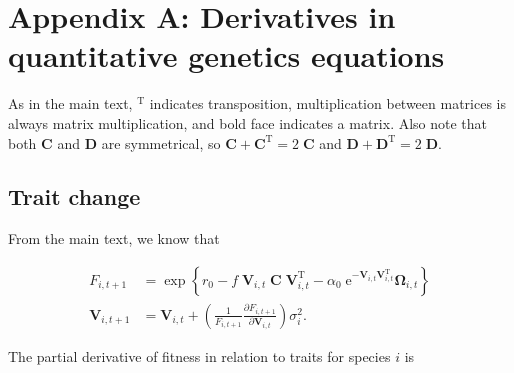\section*{Appendix A: Derivatives in quantitative genetics equations}

\renewcommand{\thefigure}{A\arabic{figure}}
\renewcommand{\theequation}{A\arabic{equation}}
\renewcommand{\thetable}{A\arabic{table}}
\setcounter{equation}{0}
\setcounter{figure}{0}
\setcounter{table}{0}


As in the main text, $^{\textrm{T}}$ indicates transposition,
multiplication between matrices is always matrix multiplication, and
bold face indicates a matrix.
Also note that both $\mathbf{C}$ and $\mathbf{D}$ are symmetrical,
so $\mathbf{C} + \mathbf{C}^{\textrm{T}} = 2 \; \mathbf{C}$ and
$\mathbf{D} + \mathbf{D}^{\textrm{T}} = 2 \; \mathbf{D}$.


\subsection*{Trait change}

From the main text, we know that

\begin{equation*}
\begin{split}
    F_{i,t+1} &= \exp \left\{
        r_0 - f \; \mathbf{V}_{i,t} \; \mathbf{C} \; \mathbf{V}_{i,t}^{\textrm{T}} -
        \alpha_0 \;\textrm{e}^{- \mathbf{V}_{i,t} \mathbf{V}_{i,t}^{\textrm{T}} } \mathbf{\Omega}_{i,t}
        \right\} \\
    \mathbf{V}_{i,t+1} &= \mathbf{V}_{i,t} + \left( \frac{1}{F_{i,t+1}}
        \frac{\partial F_{i,t+1}}{\partial \mathbf{V}_{i,t}} \right) \sigma^2_i
    \textrm{.}
\end{split}
\end{equation*}


The partial derivative of fitness in relation to traits for species $i$ is


